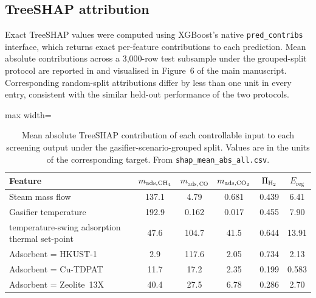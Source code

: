 \documentclass[11pt,a4paper]{article}
\newcommand{\Htwo}{\ce{H2}}
\newcommand{\COtwo}{\ce{CO2}}
\newcommand{\CHfour}{\ce{CH4}}
\newcommand{\TSA}{temperature-swing adsorption}
\begin{document}
\subsection{TreeSHAP attribution}

Exact TreeSHAP values were computed using XGBoost's native
\texttt{pred\_contribs} interface, which returns exact per-feature
contributions to each prediction. Mean absolute contributions across a
3{,}000-row test subsample under the grouped-split protocol are reported
in  and visualised in Figure~6 of the main manuscript.
Corresponding random-split attributions differ by less than one unit in
every entry, consistent with the similar held-out performance of
the two protocols.

\begin{table}[htbp]
\centering
\caption{Mean absolute TreeSHAP contribution of each controllable input to
each screening output under the gasifier-scenario-grouped split. Values are
in the units of the corresponding target. From
\texttt{shap\_mean\_abs\_all.csv}.}
\label{tabS:shapvalues}
\scriptsize
\begin{adjustbox}{max width=\textwidth}
\begin{tabular}{lccccc}
\toprule
Feature & $m_{\mathrm{ads},\CHfour}$ & $m_{\mathrm{ads},\mathrm{CO}}$ & $m_{\mathrm{ads},\COtwo}$ & $\Pi_{\Htwo}$ & $E_{\mathrm{reg}}$ \\
\midrule
Steam mass flow          & 137.1 & 4.79  & 0.681 & 0.439 & 6.41  \\
Gasifier temperature     & 192.9 & 0.162 & 0.017 & 0.455 & 7.90  \\
\TSA{} thermal set-point & 47.6  & 104.7 & 41.5  & 0.644 & 13.91 \\
Adsorbent = HKUST-1      & 2.9   & 117.6 & 2.05  & 0.734 & 2.13  \\
Adsorbent = Cu-TDPAT     & 11.7  & 17.2  & 2.35  & 0.199 & 0.583 \\
Adsorbent = Zeolite~13X  & 40.4  & 27.5  & 6.78  & 0.286 & 2.70  \\
\bottomrule
\end{tabular}
\end{adjustbox}
\end{table}
\end{document}

